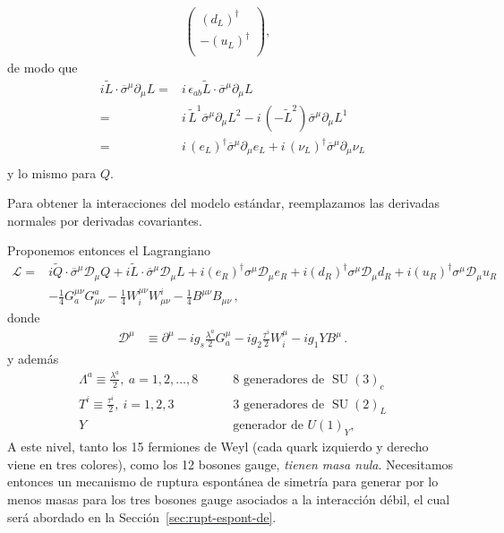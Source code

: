 \begin{frame}
\begin{align}
\begin{pmatrix}
   \left(d_L\right)^{\dagger}\\
  - \left(u_L  \right)^{\dagger}\\
  \end{pmatrix},&
\end{align}
de modo que
\begin{align*}
  i\widetilde{L}\cdot\overline{\sigma}^{\mu}\partial_{\mu}L=&
  i\,\epsilon_{ab}\widetilde{L}\cdot\overline{\sigma}^{\mu}\partial_{\mu}L \nonumber\\
 =&i\,\widetilde{L}^1\overline{\sigma}^{\mu}\partial_{\mu}L^2-i\,\left( -\widetilde{L}^2 \right)\overline{\sigma}^{\mu}\partial_{\mu}L^1    \nonumber\\
 =&i\,\left( e_L \right)^{\dagger}\overline{\sigma}^{\mu}\partial_{\mu}e_L+i\,\left( \nu_L \right)^{\dagger}\overline{\sigma}^{\mu}\partial_{\mu}\nu_L    \nonumber\\
\end{align*}
y lo mismo para $Q$.



Para obtener la interacciones del modelo estándar, reemplazamos las derivadas normales por derivadas covariantes.

Proponemos entonces el Lagrangiano
\begin{align}
\label{eq:L0}
     \mathcal{L}=&i\widetilde{Q}\cdot \overline{\sigma}^\mu\mathcal{D}_\mu Q+i\widetilde{L}\cdot \overline{\sigma}^\mu\mathcal{D}_\mu L+
i(e_R)^{\dagger}\sigma^\mu\mathcal{D}_\mu {e_R}+i(d_R)^{\dagger}\sigma^\mu\mathcal{D}_\mu d_R+i(u_R)^{\dagger}\sigma^\mu\mathcal{D}_\mu {u_R}
\nonumber\\
     &-\tfrac{1}{4}G^{\mu\nu}_a G_{\mu\nu}^a-\tfrac{1}{4}W^{\mu\nu}_i W_{\mu\nu}^i-\tfrac{1}{4}B^{\mu\nu} B_{\mu\nu}\,,
\end{align}
donde
\begin{align}
  \mathcal{D}^\mu&\equiv\partial^\mu-i g_s\frac{\lambda^a}{2}G^\mu_a-i g_2 \frac{\tau^i}{2}W^\mu_i-i {g_1}YB^\mu\,.
\end{align}
y además
\begin{align*}
  \Lambda^a\equiv\frac{\lambda^a}{2},\ a=1,2,\ldots,8 &\qquad\text{8 generadores de $\operatorname{SU}(3)_c$}\\
  T^i\equiv\frac{\tau^i}{2},\ i=1,2,3 &\qquad\text{3 generadores de $\operatorname{SU}(2)_L$}\\
  Y &\qquad\text{generador de $U(1)_Y$},
\end{align*}
A este nivel, tanto los 15 fermiones de Weyl (cada quark izquierdo y derecho viene en tres colores), como los 12 bosones gauge, \emph{tienen masa nula}. Necesitamos entonces un mecanismo de ruptura espontánea de simetría para generar por lo menos masas para los tres bosones gauge asociados a la interacción débil, el cual será abordado en la Sección~\ref{sec:rupt-espont-de}.



\end{frame}
